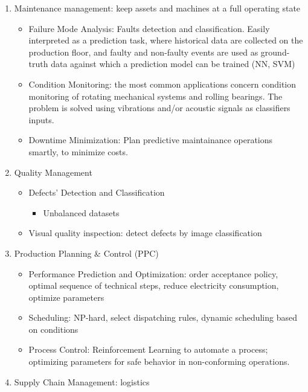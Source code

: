 \documentclass[
  letterpaper,
  DIV=11,
  numbers=noendperiod]{scrartcl}
\providecommand{\tightlist}{%
  \setlength{\itemsep}{0pt}\setlength{\parskip}{0pt}}
\begin{document}
\begin{enumerate}
\def\labelenumi{\arabic{enumi}.}
\tightlist
\item
  Maintenance management: keep assets and machines at a full operating
  state

  \begin{itemize}
  \tightlist
  \item
    Failure Mode Analysis: Faults detection and classification. Easily
    interpreted as a prediction task, where historical data are
    collected on the production floor, and faulty and non-faulty events
    are used as ground-truth data against which a prediction model can
    be trained (NN, SVM)
  \item
    Condition Monitoring: the most common applications concern condition
    monitoring of rotating mechanical systems and rolling bearings. The
    problem is solved using vibrations and/or acoustic signals as
    classifiers inputs.
  \item
    Downtime Minimization: Plan predictive maintainance operations
    smartly, to minimize costs.
  \end{itemize}
\item
  Quality Management

  \begin{itemize}
  \tightlist
  \item
    Defects' Detection and Classification

    \begin{itemize}
    \tightlist
    \item
      Unbalanced datasets
    \end{itemize}
  \item
    Visual quality inspection: detect defects by image classification
  \end{itemize}
\item
  Production Planning \& Control (PPC)

  \begin{itemize}
  \tightlist
  \item
    Performance Prediction and Optimization: order acceptance policy,
    optimal sequence of technical steps, reduce electricity consumption,
    optimize parameters
  \item
    Scheduling: NP-hard, select dispatching rules, dynamic scheduling
    based on conditions
  \item
    Process Control: Reinforcement Learning to automate a process;
    optimizing parameters for safe behavior in non-conforming
    operations.
  \end{itemize}
\item
  Supply Chain Management: logistics


\end{enumerate}
\end{document}
